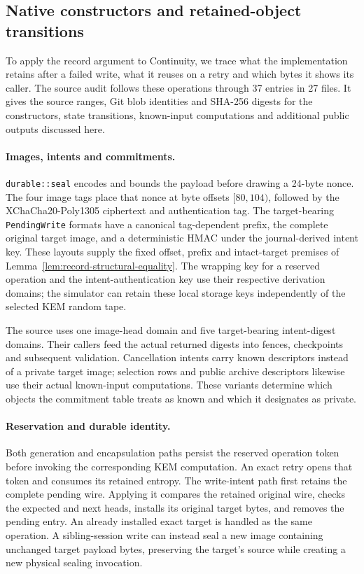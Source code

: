 \subsection{Native constructors and retained-object transitions}
\label{sec:native-correspondence}

To apply the record argument to Continuity, we trace what the
implementation retains after a failed write, what it reuses on a retry
and which bytes it shows its caller. The source audit follows these
operations through 37 entries in 27 files. It gives the source ranges,
Git blob identities and SHA-256 digests for the constructors, state
transitions, known-input computations and additional public outputs
discussed here.

\paragraph{Images, intents and commitments.}
\texttt{durable::seal} encodes and bounds the payload before drawing a
24-byte nonce. The four image tags place that nonce at byte offsets
$[80,104)$, followed by the XChaCha20-Poly1305 ciphertext and authentication
tag. The target-bearing \texttt{PendingWrite} formats have a canonical
tag-dependent prefix, the complete original target image, and a deterministic
HMAC under the journal-derived intent key. These layouts supply the fixed
offset, prefix and intact-target premises of
Lemma~\ref{lem:record-structural-equality}. The wrapping key for a reserved
operation and the intent-authentication key use their respective derivation
domains; the simulator can retain these local storage keys independently of
the selected KEM random tape.

The source uses one image-head domain and five target-bearing intent-digest
domains. Their callers feed the actual returned digests into fences,
checkpoints and subsequent validation. Cancellation intents carry known
descriptors instead of a private target image; selection rows and public
archive descriptors likewise use their actual known-input computations.
These variants determine which objects the commitment table treats as known
and which it designates as private.

\paragraph{Reservation and durable identity.}
Both generation and encapsulation paths persist the reserved operation token
before invoking the corresponding KEM computation. An exact retry opens
that token and consumes its retained entropy. The write-intent path first
retains the complete pending wire. Applying it compares the retained original
wire, checks the expected and next heads, installs its original target bytes,
and removes the pending entry. An already installed exact target is handled
as the same operation. A sibling-session write can instead seal a new image
containing unchanged target payload bytes, preserving the target's source
while creating a new physical sealing invocation.


